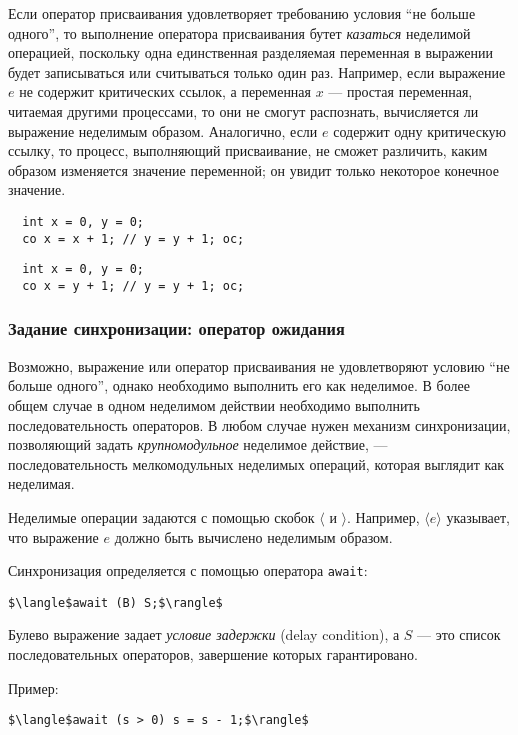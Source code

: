 Если оператор присваивания удовлетворяет требованию условия ``не больше
одного'', то выполнение оператора присваивания бутет \emph{казаться} неделимой
операцией, поскольку одна единственная разделяемая переменная в выражении будет
записываться или считываться только один раз. Например, если выражение $e$ не
содержит критических ссылок, а переменная $x$ --- простая переменная, читаемая
другими процессами, то они не смогут распознать, вычисляется ли выражение
неделимым образом. Аналогично, если $e$ содержит одну критическую ссылку, то
процесс, выполняющий присваивание, не сможет различить, каким образом изменяется
значение переменной; он увидит только некоторое конечное значение.

\begin{lstlisting}
  int x = 0, y = 0;
  co x = x + 1; // y = y + 1; oc;
\end{lstlisting}

\begin{lstlisting}
  int x = 0, y = 0;
  co x = y + 1; // y = y + 1; oc;
\end{lstlisting}


\subsubsection{Задание синхронизации: оператор ожидания}

Возможно, выражение или оператор присваивания не удовлетворяют условию ``не
больше одного'', однако необходимо выполнить его как неделимое. В более общем
случае в одном неделимом действии необходимо выполнить последовательность
операторов. В любом случае нужен механизм синхронизации, позволяющий задать
\emph{крупномодульное} неделимое действие, --- последовательность мелкомодульных
неделимых операций, которая выглядит как неделимая.

Неделимые операции задаются с помощью скобок $\langle$ и $\rangle$. Например,
$\langle e\rangle$ указывает, что выражение $e$ должно быть вычислено неделимым
образом.

Синхронизация определяется с помощью оператора \texttt{await}:

\begin{lstlisting}[mathescape]
  $\langle$await (B) S;$\rangle$
\end{lstlisting}

Булево выражение задает \emph{условие задержки} (delay condition), а $S$ --- это
список последовательных операторов, завершение которых гарантировано.

Пример:
\begin{lstlisting}[mathescape]
  $\langle$await (s > 0) s = s - 1;$\rangle$
\end{lstlisting}

